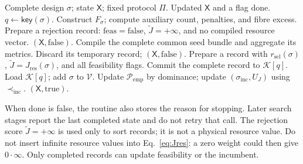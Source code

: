 \documentclass[a4paper,onecolumn,11pt,unpublished]{quantumarticle}
\theoremstyle{remark}
\begin{document}
\begin{algorithm}[H]
\caption{Evaluate one complete design}
\label{alg:app-evaluate}
\begin{algorithmic}[1]
\Require Complete design $\sigma$; state $\mathsf X$; fixed protocol $\Pi$.
\Ensure Updated $\mathsf X$ and a flag $\mathrm{done}$.
\State $q\gets\mathsf{key}(\sigma)$.
    \State Construct $F_\sigma$; compute auxiliary count, penalties, and fibre excess.
        \State Prepare a rejection record: $\mathrm{feas}=\mathrm{false}$,
        $\widetilde J=+\infty$, and no compiled resource vector.
    \Else
            \State \Return $(\mathsf X,\mathrm{false})$.
        \EndIf
        \State Compile the complete common seed bundle and aggregate its metrics.
            \State Discard its temporary record; \Return $(\mathsf X,\mathrm{false})$.
        \EndIf
        \State Prepare a record with $r_{\mathrm{sel}}(\sigma)$,
        $\widetilde J=J_{\mathrm{res}}(\sigma)$, and all feasibility flags.
    \EndIf
    \State Commit the complete record to $\mathcal K[q]$.
\EndIf
\State Load $\mathcal K[q]$; add $\sigma$ to $\mathcal V$.
    \State Update $\mathcal P_{\mathrm{emp}}$ by dominance; update
    $(\sigma_{\mathrm{inc}},U_J)$ using $\prec_{\mathrm{inc}}$.
\EndIf
\State \Return $(\mathsf X,\mathrm{true})$.
\end{algorithmic}
\end{algorithm}

When $\mathrm{done}$ is false, the routine also stores the reason for stopping.
Later search stages report the last completed state and do not retry that
call. The rejection score $\widetilde J=+\infty$ is used only to sort records;
it is not a physical resource value. Do not insert infinite resource values
into Eq.~\eqref{eq:Jres}: a zero weight could then give $0\cdot\infty$.
Only completed records can update feasibility or the incumbent.
\end{document}

